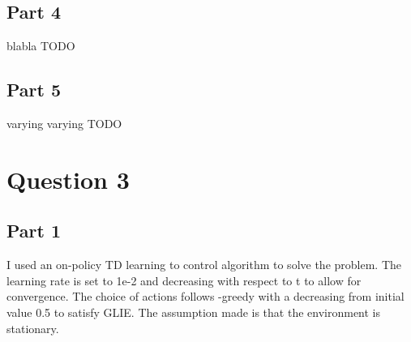 \documentclass{article}
\begin{document}
    \subsection{Part 4}\label{subsec:part-4}
    blabla TODO

    \subsection{Part 5}\label{subsec:part-5}
    varying \epsilon
    varying \alpha
    TODO


    \section{Question 3}\label{sec:question-3}

    \subsection{Part 1}\label{subsec:part-13}
    I used an on-policy TD learning to control algorithm to solve the problem.
    The learning rate \alpha is set to 1e-2 and decreasing with respect to t to allow for convergence.
    The choice of actions follows \epsilon-greedy with a decreasing \epsilon from initial value 0.5 to satisfy GLIE.
    The assumption made is that the environment is stationary.
\end{document}
